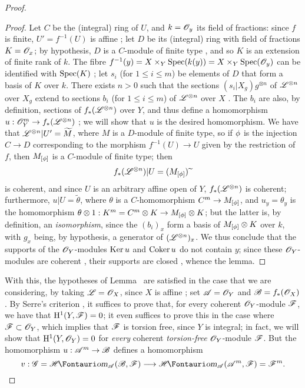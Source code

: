 \begin{proof}
  \begin{proof}
  Let $C$ be the (integral) ring of $U$, and $k=\mathscr{O}_y$ its field of fractions:
  since $f$ is finite, $U'=f^{-1}(U)$ is affine ;
  let $D$ be its (integral) ring with field of fractions $K=\mathscr{O}_x$;
  by hypothesis, $D$ is a $C$-module of finite type , and so $K$ is an extension of finite rank of $k$.
  The fibre $f^{-1}(y)=X\times_Y\operatorname{Spec}(k(y))=X\times_Y\operatorname{Spec}(\mathscr{O}_y)$ can be identified with $\operatorname{Spec}(K)$ ;
  let $s_i$ (for $1\leq i\leq m$) be elements of $D$ that form a basis of $K$ over $k$.
  There exists $n>0$ such that the sections $(s_i|X_g)g^{\otimes n}$ of $\mathscr{L}^{\otimes n}$ over $X_g$ extend to sections $b_i$ (for $1\leq i\leq m$) of $\mathscr{L}^{\otimes n}$ over $X$ .
  The $b_i$ are also, by definition, sections of $f_*(\mathscr{L}^{\otimes n})$ over $Y$, and thus define a homomorphism $u:\sh{O}_Y^m\to f_*(\sh{L}^{\otimes n})$ ;
  we will show that $u$ is the desired homomorphism.
  We have that $\mathscr{L}^{\otimes n}|U'=\widetilde{M}$, where $M$ is a $D$-module of finite type, so if $\phi$ is the injection $C\to D$ corresponding to the morphism $f^{-1}(U)\to U$ given by the restriction of $f$, then $M_{[\phi]}$ is a $C$-module of finite type;
  then
  \[
    f_*(\mathscr{L}^{\otimes n})|U = (M_{[\phi]}){\,\widetilde{\,}\,}
  \]
   is coherent, and since $U$ is an arbitrary affine open of $Y$, $f_*(\mathscr{L}^{\otimes n})$ is coherent;
  furthermore, $u|U=\widetilde{\theta}$, where $\theta$ is a $C$-homomorphism $C^m\to M_{[\vphi]}$, and $u_y=\theta_y$ is the homomorphism $\theta\otimes1:K^m=C^m\otimes K\to M_{[\vphi]}\otimes K$;
  but the latter is, by definition, an \emph{isomorphism}, since the $(b_i)_x$ form a basis of $M_{[\phi]}\otimes K$ over $k$, with $g_x$ being, by hypothesis, a generator of $(\mathscr{L}^{\otimes n})_x$.
  We thus conclude that the supports of the $\mathscr{O}_Y$-modules $\operatorname{Ker} u$ and $\operatorname{Coker} u$ do not contain $y$;
  since these $\mathscr{O}_Y$-modules are coherent , their supports are closed , whence the lemma.
  \end{proof}

With this, the hypotheses of Lemma~ are satisfied in the case that we are considering, by taking $\mathscr{L}=\mathscr{O}_X$, since $X$ is affine ;
set $\mathscr{A}=\mathscr{O}_Y$ and $\mathscr{B}=f_*(\mathscr{O}_X)$.
By Serre's criterion , it suffices to prove that, for every coherent $\mathscr{O}_Y$-module $\mathscr{F}$, we have that $\mathrm{H}^1(Y,\mathscr{F})=0$;
it even suffices to prove this in the case where $\mathscr{F}\subset\mathscr{O}_Y$, which implies that $\mathscr{F}$ is torsion free, since $Y$ is integral;
in fact, we will show that $\mathrm{H}^1(Y,\mathscr{O}_Y)=0$ for \emph{every} coherent \emph{torsion-free} $\mathscr{O}_Y$-module $\mathscr{F}$.
But the homomorphism $u:\sh{A}^m\to\sh{B}$ defines a homomorphism
\[
  v : \sh{G} = \shHom_{\sh{A}}(\sh{B},\sh{F}) \to \shHom_{\sh{A}}(\sh{A}^m,\sh{F}) = \sh{F}^m.
\]


\end{proof}
